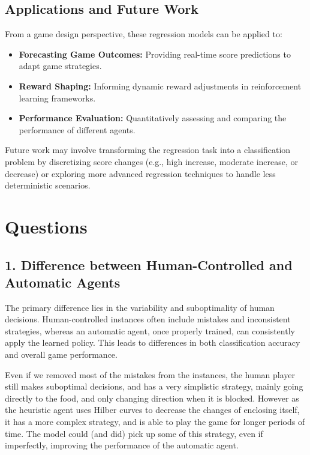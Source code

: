 \documentclass[12pt,a4paper]{article}
\begin{document}
\subsection{Applications and Future Work}
From a game design perspective, these regression models can be applied to:
\begin{itemize}
    \item \textbf{Forecasting Game Outcomes:} Providing real-time score predictions to adapt game strategies.
    \item \textbf{Reward Shaping:} Informing dynamic reward adjustments in reinforcement learning frameworks.
    \item \textbf{Performance Evaluation:} Quantitatively assessing and comparing the performance of different agents.
\end{itemize}
Future work may involve transforming the regression task into a classification problem by discretizing score changes (e.g., high increase, moderate increase, or decrease) or exploring more advanced regression techniques to handle less deterministic scenarios.


\newpage
\section{Questions}
\subsection*{1. Difference between Human-Controlled and Automatic Agents}
The primary difference lies in the variability and suboptimality of human decisions. 
Human-controlled instances often include mistakes and inconsistent strategies, whereas an automatic agent, once properly trained, can consistently apply the learned policy. 
This leads to differences in both classification accuracy and overall game performance.

Even if we removed most of the mistakes from the instances, the human player still makes suboptimal decisions,
and has a very simplistic strategy, mainly going directly to the food, and only changing direction when it is blocked.
However as the heuristic agent uses Hilber curves to decrease the changes of enclosing itself, it has a more complex strategy, and is able to play the game for longer periods of time.
The model could (and did) pick up some of this strategy, even if imperfectly, improving the performance of the automatic agent.
\end{document}
